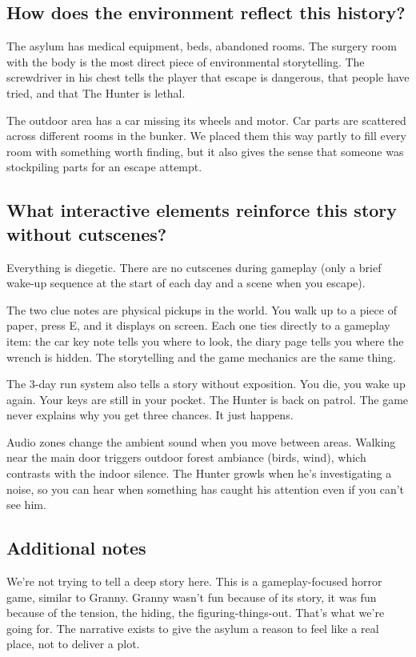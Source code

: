 \documentclass[12pt, a4paper]{article}
\begin{document}
\subsection{How does the environment reflect this history?}

The asylum has medical equipment, beds, abandoned rooms. The surgery room with the body is the most direct piece of environmental storytelling. The screwdriver in his chest tells the player that escape is dangerous, that people have tried, and that The Hunter is lethal.

The outdoor area has a car missing its wheels and motor. Car parts are scattered across different rooms in the bunker. We placed them this way partly to fill every room with something worth finding, but it also gives the sense that someone was stockpiling parts for an escape attempt.

\subsection{What interactive elements reinforce this story without cutscenes?}

Everything is diegetic. There are no cutscenes during gameplay (only a brief wake-up sequence at the start of each day and a scene when you escape).

The two clue notes are physical pickups in the world. You walk up to a piece of paper, press E, and it displays on screen. Each one ties directly to a gameplay item: the car key note tells you where to look, the diary page tells you where the wrench is hidden. The storytelling and the game mechanics are the same thing.

The 3-day run system also tells a story without exposition. You die, you wake up again. Your keys are still in your pocket. The Hunter is back on patrol. The game never explains why you get three chances. It just happens.

Audio zones change the ambient sound when you move between areas. Walking near the main door triggers outdoor forest ambiance (birds, wind), which contrasts with the indoor silence. The Hunter growls when he's investigating a noise, so you can hear when something has caught his attention even if you can't see him.

\subsection{Additional notes}

We're not trying to tell a deep story here. This is a gameplay-focused horror game, similar to Granny. Granny wasn't fun because of its story, it was fun because of the tension, the hiding, the figuring-things-out. That's what we're going for. The narrative exists to give the asylum a reason to feel like a real place, not to deliver a plot.
\end{document}

